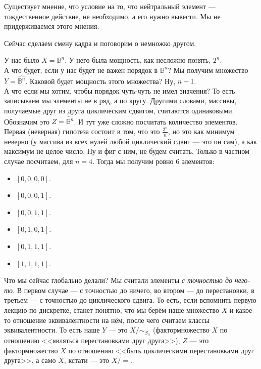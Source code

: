 \documentclass{article}
\begin{document}
\begin{itemize}
\begin{Comment}
            Существует мнение, что условие на то, что нейтральный элемент --- тождественное действие, не необходимо, а его нужно вывести. Мы не придерживаемся этого мнения.
        \end{Comment}
        \begin{Comment}
            Сейчас сделаем смену кадра и поговорим о немножко другом.
        \end{Comment}
        \begin{Comment}
            У нас было $X=\mathbb B^n$. У него была мощность, как несложно понять, $2^n$.\\
            А что будет, если у нас будет не важен порядок в $\mathbb B^n$? Мы получим множество $Y=\widehat{\mathbb B^n}$. Каковой будет мощность этого множества? Ну, $n+1$.\\
            А что если мы хотим, чтобы порядок чуть-чуть не имел значения? То есть записываем мы элементы не в ряд, а по кругу. Другими словами, массивы, получаемые друг из друга циклическим сдвигом, считаются одинаковыми. Обозначим это $Z=\widetilde{\mathbb B^n}$. И тут уже сложно посчитать количество элементов. Первая (неверная) гипотеза состоит в том, что это $\frac{2^n}n$, но это как минимум неверно (у массива из всех нулей любой циклический сдвиг --- это он сам), а как максимум не целое число. Ну и фиг с ним, не будем считать. Только в частном случае посчитаем, для $n=4$. Тогда мы получим ровно 6 элементов:
            \begin{itemize}
                \item $[0,0,0,0]$.
                \item $[0,0,0,1]$.
                \item $[0,0,1,1]$.
                \item $[0,1,0,1]$.
                \item $[0,1,1,1]$.
                \item $[1,1,1,1]$.
            \end{itemize}
            Что мы сейчас глобально делали? Мы считали элементы \textit{с точностью до чего-то}. В первом случае --- с точностью до ничего, во втором --- до перестановки, в третьем --- с точностью до циклического сдвига. То есть, если вспомнить первую лекцию по дискретке, станет понятно, что мы берём наше множество $X$ и какое-то отношение эквивалентности на нём, после чего считаем классы эквивалентности. То есть наше $Y$ --- это $X/\sim_{S_n}$ (фактормножество $X$ по отношению <<являться перестановками друг друга>>), $Z$ --- это фактормножество $X$ по отношению <<быть циклическими перестановками друг друга>>, а само $X$, кстати --- это $X/=$.\\

\end{Comment}
\end{itemize}
\end{document}
